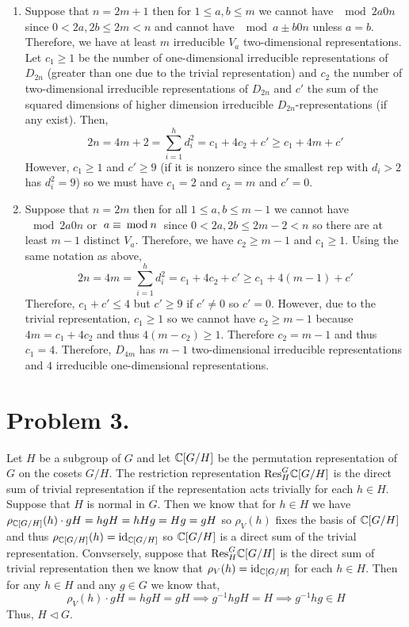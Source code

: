 \documentclass[12pt]{extarticle}
\begin{document}
\begin{enumerate}
\item Suppose that $n = 2 m + 1$ then for $1 \le a,b \le m$ we cannot have $\mod{2a}{0}{n}$ since $0 < 2a, 2b \le 2m < n$ and cannot have $\mod{a \pm b}{0}{n}$ unless $a = b$. Therefore, we have at least $m$ irreducible $V_a$ two-dimensional representations. Let $c_1 \ge 1$ be the number of one-dimensional irreducible representations of $D_{2n}$ (greater than one due to the trivial representation) and $c_2$ the number of two-dimensional irreducible representations of $D_{2n}$ and $c'$ the sum of the squared dimensions of higher dimension irreducible $D_{2n}$-representations (if any exist). Then,
\[ 2n = 4m + 2 = \sum_{i = 1}^h d_i^2 = c_1 + 4 c_2 + c' \ge c_1 + 4 m + c' \]
However, $c_1 \ge 1$ and $c' \ge 9$ (if it is nonzero since the smallest rep with $d_i > 2$ has $d_i^2 = 9$) so we must have $c_1 = 2$ and $c_2 = m$ and $c' = 0$. 


\item Suppose that $n = 2m$ then for all $1 \le a, b \le m-1$ we cannot have $\mod{2a}{0}{n}$ or $\mod{a}{\pmb}{n}$ since $0 < 2a, 2b \le 2m - 2 < n$ so there are at least $m-1$ distinct $V_a$. Therefore, we have $c_2 \ge m - 1$ and $c_1 \ge 1$. Using the same notation as above, 
\[ 2n = 4m = \sum_{i = 1}^h d_i^2 = c_1 + 4 c_2 + c' \ge c_1 + 4 (m - 1) + c' \]
Therefore, $c_1 + c' \le 4$ but $c' \ge 9$ if $c' \neq 0$ so $c' = 0$. However, due to the trivial representation, $c_1 \ge 1$ so we cannot have $c_2 \ge m - 1$ because $4 m = c_1 + 4 c_2$ and thus $4(m - c_2) \ge 1$. Therefore $c_2 = m-1$ and thus $c_1 = 4$. Therefore, $D_{4m}$ has $m-1$ two-dimensional irreducible representations and $4$ irreducible one-dimensional representations. 


\end{enumerate}


\section*{Problem 3.}

Let $H$ be a subgroup of $G$ and let $\C[G/H]$ be the permutation representation of $G$ on the cosets $G/H$. The restriction representation $\mathrm{Res}^G_H \C[G/H]$ is the direct sum of trivial representation if the representation acts trivially for each $h \in H$. Suppose that $H$ is normal in $G$. Then we know that for $h \in H$ we have $\rho_{\C[G/H]}(h) \cdot gH = hg H = h H g = Hg = gH$ so $\rho_V(h)$ fixes the basis of $\C[G/H]$ and thus $\rho_{\C[G/H]}(h) = \id_{\C[G/H]}$ so $\C[G/H]$ is a direct sum of the trivial representation.   Convsersely, suppose that $\mathrm{Res}^G_H \C[G/H]$ is the direct sum of trivial representation then we know that $\rho_V(h) = \id_{\C[G/H]}$ for each $h \in H$. Then for any $h \in H$ and any $g \in G$ we know that,
\[ \rho_V(h) \cdot gH = hg H = gH \implies g^{-1} h g H = H \implies g^{-1} h g \in H \]
Thus, $H \triangleleft G$.  
\end{document}
